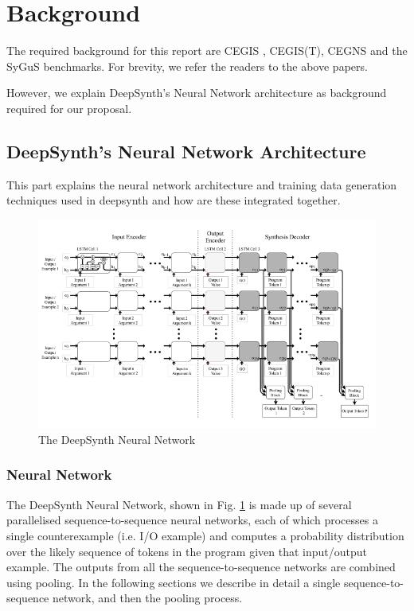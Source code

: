 \section{Background}

The required background for this report are CEGIS \cite{10.5555/1714168}, CEGIS(T)\cite{abate2018counterexample}, CEGNS\cite{polgreen2020counterexample} and the SyGuS \cite{6679385} benchmarks. For brevity, we refer the readers to the above papers. 

However, we explain DeepSynth's Neural Network architecture as background required for our proposal.

\subsection{DeepSynth's Neural Network Architecture}
\label{dgnn}
This part explains the neural network architecture and training data generation techniques used in deepsynth and how are these integrated together.

\begin{figure}
    \centering
    \includegraphics[scale=0.5]{DSNN.png}
    \caption{The DeepSynth Neural Network}
    \label{fig:dsnn}
\end{figure}

\subsubsection{Neural Network}
The DeepSynth Neural Network, shown in Fig. \ref{fig:dsnn} is made up of several parallelised sequence-to-sequence neural networks, each of which processes a single counterexample (i.e. I/O example) and computes a probability distribution over the likely sequence of tokens in the program given that input/output example. The outputs from all the sequence-to-sequence networks are combined using pooling. In the following sections we describe in detail a single sequence-to-sequence network, and then the pooling process.

